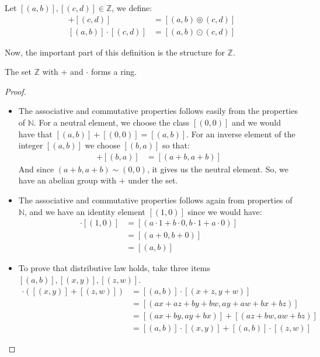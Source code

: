 \documentclass{tufte-handout}
\begin{document}
\begin{definition}
	Let $[(a, b)], [(c, d)] \in \mathbb{Z}$, we define:
	\begin{align*}
		[(a, b)] + [(c, d)] &= [(a, b) \circledcirc (c, d)]\\
		[(a, b)] \cdot [(c, d)] &= [(a, b) \odot (c, d)]
	\end{align*}
\end{definition}

Now, the important part of this definition is the structure for $\mathbb{Z}$.

\begin{theorem}
	The set $\mathbb{Z}$ with $+$ and $\cdot$ forms a ring.
\end{theorem}
\begin{proof}
	\begin{itemize}
		\item The associative and commutative properties follows easily from the properties of $\mathbb{N}$. For a neutral element, we choose the class $[(0, 0)]$ and we would have that $[(a, b)] + [(0, 0)] = [(a, b)]$. For an inverse element of the integer $[(a, b)]$ we choose $[(b, a)]$ so that:
		\begin{align*}
			[(a, b)] + [(b, a)] &= [(a + b, a + b)]
		\end{align*}
		And since $(a+b, a+b) \sim (0, 0)$, it gives us the neutral element. So, we have an abelian group with $+$ under the set.
		\item The associative and commutative properties follows again from properties of $\mathbb{N}$, and we have an identity element $[(1, 0)]$ since we would have:
		\begin{align*}
			[(a, b)] \cdot [(1, 0)] &= [(a\cdot 1 + b\cdot 0, b\cdot 1 + a \cdot 0)]\\
			&= [(a + 0, b + 0)]\\
			&= [(a, b)]
		\end{align*}

		\item To prove that distributive law holds, take three items $[(a, b)], [(x, y)], [(z, w)]$.
		\begin{align*}
			[(a, b)] \cdot ([(x, y)] + [(z, w)]) &= [(a, b)] \cdot [(x+z, y+w)]\\
			&= [(ax+az+by+bw, ay+aw+bx+bz)]\\
			&= [(ax+by, ay+bx)] + [(az+bw, aw+bz)]\\
			&= [(a, b)] \cdot [(x, y)] + [(a, b)] \cdot [(z, w)]
		\end{align*}
	\end{itemize}
\end{proof}
\end{document}
